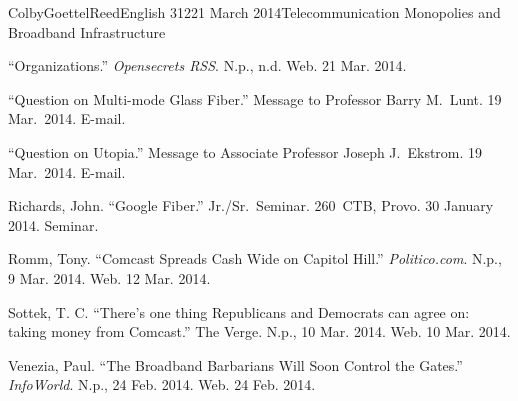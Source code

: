 \documentclass[12pt]{article}
\begin{document}
\begin{mla}{Colby}{Goettel}{Reed}{English 312}{21 March 2014}{Telecommunication Monopolies and Broadband Infrastructure}
\begin{workscited}
    \bibent ``Organizations.'' \textit{Opensecrets RSS}. N.p., n.d. Web. 21 Mar. 2014.
    
    \bibent ``Question on Multi-mode Glass Fiber.'' Message to Professor Barry M.\ Lunt. 19 Mar.\ 2014. E-mail.
    
    \bibent ``Question on Utopia.'' Message to Associate Professor Joseph J.\ Ekstrom. 19 Mar.\ 2014. E-mail.
    
    \bibent Richards, John. ``Google Fiber.'' Jr./Sr.\ Seminar. 260~CTB, Provo. 30 January 2014. Seminar.
    
    \bibent Romm, Tony. ``Comcast Spreads Cash Wide on Capitol Hill.'' \textit{Politico.com}. N.p., 9 Mar. 2014. Web. 12 Mar. 2014.
    
    \bibent Sottek, T. C. ``There's one thing Republicans and Democrats can agree on: taking money from Comcast.'' The Verge. N.p., 10 Mar. 2014. Web. 10 Mar. 2014.
    
    \bibent Venezia, Paul. ``The Broadband Barbarians Will Soon Control the Gates.'' \textit{InfoWorld}. N.p., 24 Feb. 2014. Web. 24 Feb. 2014.
\end{workscited}

\end{mla}
\end{document}
